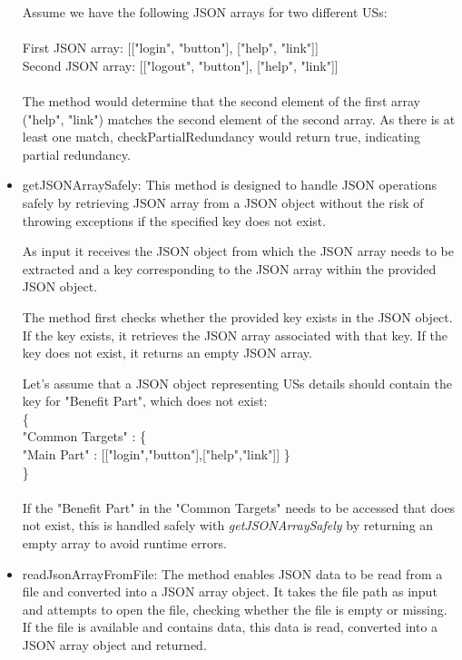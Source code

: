 \begin{itemize}
	 \begin{example} Assume we have the following JSON arrays for two different USs: \\\\
	 First JSON array: [["login", "button"], ["help", "link"]]\\
	 Second JSON array:	[["logout", "button"], ["help", "link"]]\\\\
	 The method would determine that the second element of the first array ("help", "link") matches the second element of the second array. As there is at least one match, checkPartialRedundancy would return true, indicating partial redundancy.
	 \end{example}
	 
		
	\item getJSONArraySafely: This method is designed to handle JSON operations safely by retrieving JSON array from a JSON object without the risk of throwing exceptions if the specified key does not exist.
	
	As input it receives the JSON object from which the JSON array needs to be extracted and a key corresponding to the JSON array within the provided JSON object.
	
	The method first checks whether the provided key exists in the JSON object. If the key exists, it retrieves the JSON array associated with that key. If the key does not exist, it returns an empty JSON array.
	\begin{example} Let's assume that a JSON object representing USs details should contain the key for "Benefit Part", which does not exist:\\
		\{\\
			"Common Targets" : \{\\
				"Main Part" : [["login","button"],["help","link"]]
			\}\\
		\} \\\\
	If the "Benefit Part" in the "Common Targets" needs to be accessed that does not exist, this is handled safely with \textit{getJSONArraySafely} by returning an empty array to avoid runtime errors.
	\end{example}
	
	\item readJsonArrayFromFile: The method enables JSON data to be read from a file and converted into a JSON array object. It takes the file path as input and attempts to open the file, checking whether the file is empty or missing. If the file is available and contains data, this data is read, converted into a JSON array object and returned.
	 
\end{itemize}



